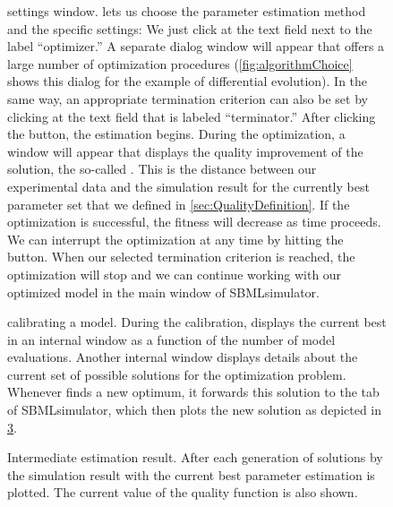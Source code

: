 \begin{figure}[htbp]
\centering
{}
\caption[\EvA settings window]{\EvA settings window.
\EvA lets us choose the parameter estimation method and the specific settings:
We just click at the text field next to the label ``optimizer.''
A separate dialog window will appear that offers a large number of optimization procedures (\cref{fig:algorithmChoice} shows this dialog for the example of differential evolution).
In the same way, an appropriate termination criterion can also be set by clicking at the text field that is labeled ``terminator.''
After clicking the  button, the estimation begins.
During the optimization, a window will appear that displays the quality improvement of the solution, the so-called \emph{\fitness}.
This is the distance between our experimental data and the simulation result for the currently best parameter set that we defined in \cref{sec:QualityDefinition}.
If the optimization is successful, the fitness will decrease as time proceeds.
We can interrupt the optimization at any time by hitting the  button.
When our selected termination criterion is reached, the optimization will stop and we can continue working with our optimized model in the main window of SBMLsimulator.}
\label{fig:eva2}
\end{figure}
\begin{figure}[htbp]
\centering
{}
\caption[\EvA calibrating a model]{\EvA calibrating a model.
During the calibration, \EvA displays the current best \fitness in an internal window as a function of the number of model evaluations.
Another internal window displays details about the current set of possible solutions for the optimization problem.
Whenever \EvA finds a new optimum, it forwards this solution to the  tab of SBMLsimulator, which then plots the new solution as depicted in \cref{fig:estimationResult}.}
\label{fig:evaOptimizing}
\end{figure}
\begin{SCfigure}
{}
\caption[Configuring the optimization procedure]{Configuring the optimization procedure.
We can select an optimization procedure and define its specific settings in this window. 
Apart from \DE \citep{Storn96Usage}, \EvA provides many other nature-inspired heuristic optimization routines, such as \PSO \citep{ClercKennedy02, Clerc2005}.
The settings of the chosen routine can be changed by clicking in the text field right of it and typing the new value or by clicking in the check box, respectively.}
\label{fig:algorithmChoice}
\end{SCfigure}
\begin{figure}[h]
\centering
{}
\caption[Intermediate estimation result]{Intermediate estimation result.
After each generation of solutions by \EvA the simulation result with the current best parameter estimation is plotted.
The current value of the quality function is also shown.}
\label{fig:estimationResult}
\end{figure}



